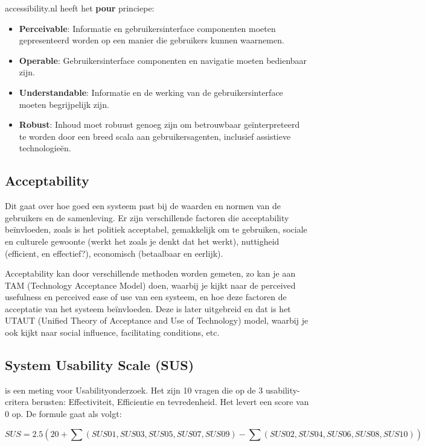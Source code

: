 \documentclass[nonacm, sigconf, balance=true]{acmart}
\begin{document}
    accessibility.nl heeft het \textbf{pour} princiepe:
    \begin{itemize}
        \item \textbf{Perceivable}: Informatie en gebruikersinterface componenten moeten gepresenteerd worden op een manier die gebruikers kunnen waarnemen.
        \item \textbf{Operable}: Gebruikersinterface componenten en navigatie moeten bedienbaar zijn.
        \item \textbf{Understandable}: Informatie en de werking van de gebruikersinterface moeten begrijpelijk zijn.
        \item \textbf{Robust}: Inhoud moet robuust genoeg zijn om betrouwbaar geïnterpreteerd te worden door een breed scala aan gebruikersagenten, inclusief assistieve technologieën.
    \end{itemize}

    \subsection{Acceptability}
    Dit gaat over hoe goed een systeem past bij de waarden en normen van de gebruikers en de samenleving.
    Er zijn verschillende factoren die acceptability beïnvloeden, zoals is het politiek acceptabel, gemakkelijk om te gebruiken, sociale en culturele gewoonte (werkt het zoals je denkt dat het werkt), nuttigheid (efficient, en effectief?), economisch (betaalbaar en eerlijk).

    Acceptability kan door verschillende methoden worden gemeten, zo kan je aan TAM (Technology Acceptance Model) doen, waarbij je kijkt naar de perceived usefulness en perceived ease of use van een systeem, en hoe deze factoren de acceptatie van het systeem beïnvloeden.
    Deze is later uitgebreid en dat is het UTAUT (Unified Theory of Acceptance and Use of Technology) model, waarbij je ook kijkt naar social influence, facilitating conditions, etc.

    \subsection{System Usability Scale (SUS)} is een meting voor Usabilityonderzoek.
    Het zijn 10 vragen die op de 3 usability-critera berusten: Effectiviteit, Efficientie en tevredenheid.
    Het levert een score van 0  op.
    De formule gaat als volgt:

    \[SUS = 2.5 (20 + \sum (SUS01, SUS03, SUS05, SUS07, SUS09) - \sum (SUS02, SUS04, SUS06, SUS08, SUS10))\]
\end{document}
